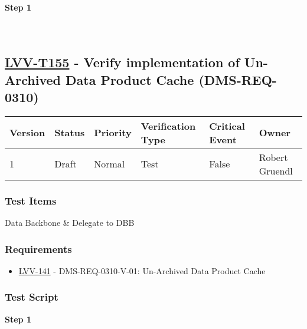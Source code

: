 \textbf{Step 1}\\
~\\
~\\

\hypertarget{lvv-t155---verify-implementation-of-un-archived-data-product-cache-dms-req-0310}{%
\subsection{\texorpdfstring{\href{https://jira.lsstcorp.org/secure/Tests.jspa\#/testCase/LVV-T155}{LVV-T155}
- Verify implementation of Un-Archived Data Product Cache
(DMS-REQ-0310)}{LVV-T155 - Verify implementation of Un-Archived Data Product Cache (DMS-REQ-0310)}}\label{lvv-t155---verify-implementation-of-un-archived-data-product-cache-dms-req-0310}}

\begin{longtable}[]{@{}llllll@{}}
\toprule
Version & Status & Priority & Verification Type & Critical Event &
Owner\tabularnewline
\midrule
\endhead
1 & Draft & Normal & Test & False & Robert Gruendl\tabularnewline
\bottomrule
\end{longtable}

\hypertarget{test-items-131}{%
\subsubsection{Test Items}\label{test-items-131}}

Data Backbone \& Delegate to DBB

\hypertarget{requirements-132}{%
\subsubsection{Requirements}\label{requirements-132}}

\begin{itemize}
\tightlist
\item
  \href{https://jira.lsstcorp.org/browse/LVV-141}{LVV-141} -
  DMS-REQ-0310-V-01: Un-Archived Data Product Cache
\end{itemize}

\hypertarget{test-script-132}{%
\subsubsection{Test Script}\label{test-script-132}}

\textbf{Step 1}\\
~\\
~\\

